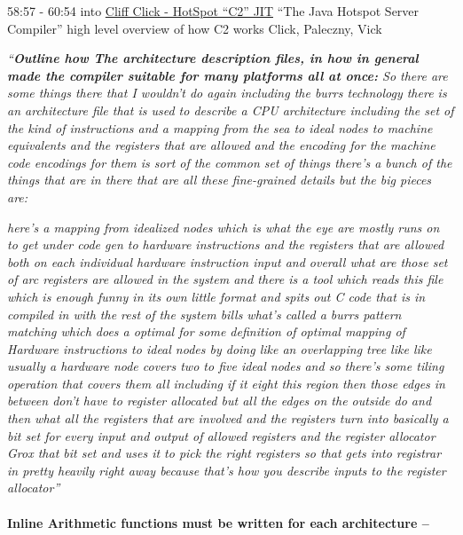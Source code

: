 58:57 - 60:54 into \href{https://youtu.be/9epgZ-e6DUU}{Cliff Click -
HotSpot ``C2'' JIT} ``The Java Hotspot Server Compiler'' high level
overview of how C2 works Click, Paleczny, Vick

\emph{``\textbf{Outline how The architecture description files, in how
in general made the compiler suitable for many platforms all at once:}
So there are some things there that I wouldn't do again including the
burrs technology there is an architecture file that is used to describe
a CPU architecture including the set of the kind of instructions and a
mapping from the sea to ideal nodes to machine equivalents and the
registers that are allowed and the encoding for the machine code
encodings for them is sort of the common set of things there's a bunch
of the things that are in there that are all these fine-grained details
but the big pieces are:}

\emph{here's a mapping from idealized nodes which is what the eye are
mostly runs on to get under code gen to hardware instructions and the
registers that are allowed both on each individual hardware instruction
input and overall what are those set of arc registers are allowed in the
system and there is a tool which reads this file which is enough funny
in its own little format and spits out C code that is in compiled in
with the rest of the system bills what's called a burrs pattern matching
which does a optimal for some definition of optimal mapping of Hardware
instructions to ideal nodes by doing like an overlapping tree like like
usually a hardware node covers two to five ideal nodes and so there's
some tiling operation that covers them all including if it eight this
region then those edges in between don't have to register allocated but
all the edges on the outside do and then what all the registers that are
involved and the registers turn into basically a bit set for every input
and output of allowed registers and the register allocator Grox that bit
set and uses it to pick the right registers so that gets into registrar
in pretty heavily right away because that's how you describe inputs to
the register allocator''}

\hypertarget{inline-arithmetic-functions-must-be-written-for-each-architecture}{%
\paragraph{Inline Arithmetic functions must be written for each
architecture
--}\label{inline-arithmetic-functions-must-be-written-for-each-architecture}}

